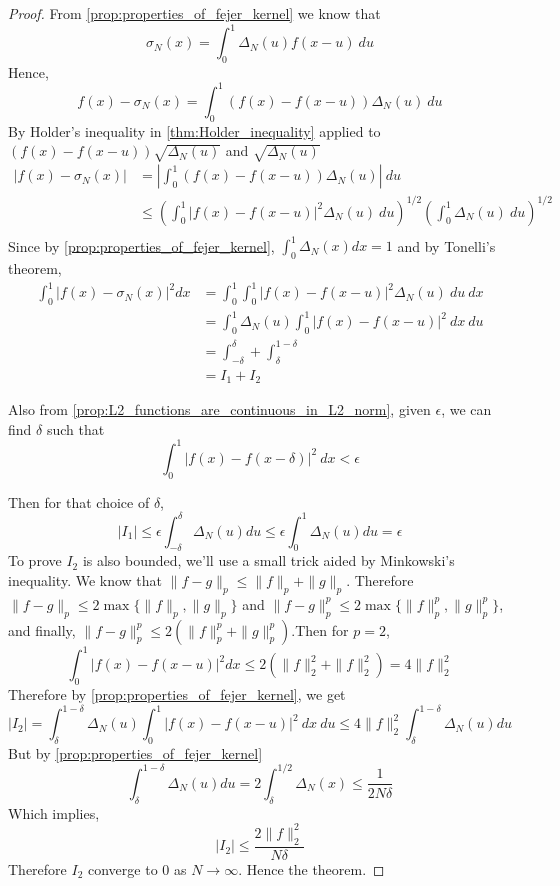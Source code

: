 \begin{proof}
  From \autoref{prop:properties_of_fejer_kernel} we know that
  \begin{displaymath}
    \sigma_N(x) = \int_0^1 \Delta_N(u)f(x-u) \ du 
  \end{displaymath}
  Hence,
  $$ f(x) - \sigma_N(x) = \int_0^1 (f(x) - f(x-u))\Delta_N(u) \ du $$ 
  By Holder's inequality in \autoref{thm:Holder_inequality} applied to $(f(x) - f(x-u))\sqrt{\Delta_N(u)}$ and $\sqrt{\Delta_N(u)}$ 
  \begin{align*}
    |f(x) - \sigma_N(x)| &= \left| \int_0^1 (f(x) - f(x-u))\Delta_N(u) \right| \ du \\
          &\le \left( \int_0^1 |f(x) - f(x-u)|^{2} \Delta_N(u) \ du \right)^{1/2} \left( \int_0^1 \Delta_N(u) \ du \right)^{1/2} \\
  \end{align*}
  Since by \autoref{prop:properties_of_fejer_kernel}, $\int_0^1 \Delta_N(x) dx = 1$ and by Tonelli's theorem, 
  \begin{align*}
    \int_0^1 |f(x) - \sigma_N(x)|^2 dx &= \int_0^1 \int_0^1 |f(x) - f(x-u)|^{2} \Delta_N(u) \ du  \ dx \\
          & = \int_0^1 \Delta_N(u) \int_0^1 |f(x) - f(x-u)|^{2} \ dx  \ du \\
          & = \int_{-\delta}^\delta + \int_\delta^{1-\delta} \\
          & = I_1 + I_2
  \end{align*}

  Also from \autoref{prop:L2_functions_are_continuous_in_L2_norm}, given $\epsilon$, we can find $\delta$ such that 
  $$ \int_0^1|f(x) - f(x-\delta)|^2 \ dx < \epsilon$$

  Then for that choice of $\delta$,
  $$|I_1| \le \epsilon \int_{-\delta}^\delta \Delta_N(u) du \le \epsilon \int_0^1 \Delta_N(u) du = \epsilon$$
  To prove $I_2$ is also bounded, we'll use a small trick aided by Minkowski's inequality. We know that $\|f-g\|_p \le \|f\|_p + \|g\|_p$. Therefore $\|f-g\|_p \le 2\max\{\|f\|_p, \|g\|_p\}$ and $\|f-g\|_p^p \le 2\max\{\|f\|_p^p, \|g\|_p^p\}$, and finally, $\|f-g\|_p^p \le 2(\|f\|_p^p + \|g\|_p^p)$.Then for $p=2$, 
  $$ \int_0^1 |f(x) - f(x-u)|^2 dx \le 2(\|f\|_2^2 + \|f\|_2^2) = 4\|f\|_2^2$$
  Therefore by \autoref{prop:properties_of_fejer_kernel}, we get 
  $$|I_2| = \int_\delta^{1-\delta} \Delta_N(u) \int_0^1 |f(x) - f(x-u)|^{2} \ dx  \ du \le 4\|f\|_2^2 \int_\delta^{1-\delta}\Delta_N(u) du$$
  But by \autoref{prop:properties_of_fejer_kernel} 
  $$ \int_\delta^{1-\delta}\Delta_N(u)du = 2\int_\delta^{1/2}\Delta_N(x) \le \frac{1}{2N\delta}$$
  Which implies, 
  $$ |I_2| \le \frac{2\|f\|_2^2}{N\delta}$$
  Therefore $I_2$ converge to $0$ as $N \to \infty$. Hence the theorem.
\end{proof}

